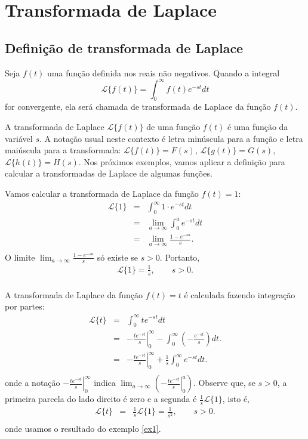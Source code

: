 \chapter{Transformada de Laplace}
\section{Definição de transformada de Laplace}{\label{sec_1}}
\begin{defn}Seja $f(t)$ uma função definida nos reais não negativos. Quando a integral
$$
{\mathcal{L}}\{f(t)\}=\int_0^\infty f(t)e^{-st}dt
$$
for convergente, ela será chamada de transformada de Laplace da função $f(t)$.
\end{defn}
A transformada de Laplace $\mathcal{L}\{f(t)\}$ de uma função $f(t)$ é uma função da variável $s$. A notação usual neste contexto é letra minúscula para a função e letra maiúscula para a transformada: $\mathcal{L}\{f(t)\}=F(s)$, $\mathcal{L}\{g(t)\}=G(s)$, $\mathcal{L}\{h(t)\}=H(s)$.
Nos próximos exemplos, vamos aplicar a definição para calcular a transformadas de Laplace de algumas funções.
\begin{ex}\label{ex1} Vamos calcular a transformada de Laplace da função $f(t)=1$:
\begin{eqnarray*}
\mathcal{L}\{1\}&=&\int_0^\infty 1\cdot e^{-st}dt\\
&=&\lim_{a\to\infty}\int_0^a  e^{-st}dt\\
&=&\lim_{a\to\infty} \frac{1-e^{-sa}}{s}.\\
\end{eqnarray*}
O limite $\displaystyle\lim_{a\to\infty}\frac{1-e^{-sa}}{s}$ só existe se $s>0$. Portanto,
\begin{eqnarray*}
\mathcal{L}\{1\}=\frac{1}{s},\qquad s>0.\\
\end{eqnarray*}
\end{ex}
\begin{ex}\label{ex2} A transformada de Laplace da função $f(t)=t$ é calculada fazendo integração por partes:
\begin{eqnarray*}
\mathcal{L}\{t\}&=&\int_0^\infty te^{-st}dt\\
&=&\left.-\frac{te^{-st}}{s}\right|_0^\infty-\int_0^\infty \left(-\frac{e^{-st}}{s}\right)dt .\\
&=&\left.-\frac{te^{-st}}{s}\right|_0^\infty+\frac{1}{s}\int_0^\infty e^{-st}dt .\\
\end{eqnarray*}
onde a notação $\displaystyle\left.-\frac{te^{-st}}{s}\right|_0^\infty$ indica $\displaystyle\lim_{a\to\infty}\left(\left.-\frac{te^{-st}}{s} \right|_0^a\right)$. Observe que, se $s>0$, a primeira parcela do lado direito é zero e a segunda é $\frac{1}{s}\mathcal{L}\{1\}$, isto é,
\begin{eqnarray*}
\mathcal{L}\{t\}&=&\frac{1}{s}\mathcal{L}\{1\}=\frac{1}{s^2},\qquad s>0.\\
\end{eqnarray*}
onde usamos o resultado do exemplo \ref{ex1}.
\end{ex}
